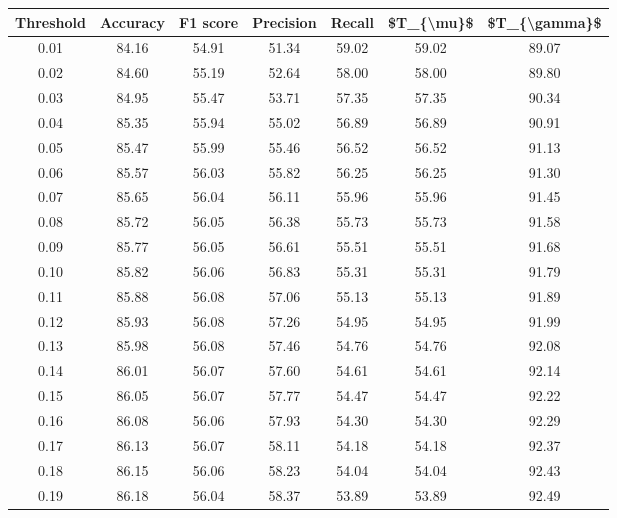\begin{tabular}{|c|c|c|c|c|c|c|}
\hline
 Threshold &  Accuracy &  F1 score &  Precision &  Recall &  \$T\_\{\textbackslash mu\}\$ &  \$T\_\{\textbackslash gamma\}\$ \\
\hline
      0.01 &     84.16 &     54.91 &      51.34 &   59.02 &      59.02 &         89.07 \\
      0.02 &     84.60 &     55.19 &      52.64 &   58.00 &      58.00 &         89.80 \\
      0.03 &     84.95 &     55.47 &      53.71 &   57.35 &      57.35 &         90.34 \\
      0.04 &     85.35 &     55.94 &      55.02 &   56.89 &      56.89 &         90.91 \\
      0.05 &     85.47 &     55.99 &      55.46 &   56.52 &      56.52 &         91.13 \\
      0.06 &     85.57 &     56.03 &      55.82 &   56.25 &      56.25 &         91.30 \\
      0.07 &     85.65 &     56.04 &      56.11 &   55.96 &      55.96 &         91.45 \\
      0.08 &     85.72 &     56.05 &      56.38 &   55.73 &      55.73 &         91.58 \\
      0.09 &     85.77 &     56.05 &      56.61 &   55.51 &      55.51 &         91.68 \\
      0.10 &     85.82 &     56.06 &      56.83 &   55.31 &      55.31 &         91.79 \\
      0.11 &     85.88 &     56.08 &      57.06 &   55.13 &      55.13 &         91.89 \\
      0.12 &     85.93 &     56.08 &      57.26 &   54.95 &      54.95 &         91.99 \\
      0.13 &     85.98 &     56.08 &      57.46 &   54.76 &      54.76 &         92.08 \\
      0.14 &     86.01 &     56.07 &      57.60 &   54.61 &      54.61 &         92.14 \\
      0.15 &     86.05 &     56.07 &      57.77 &   54.47 &      54.47 &         92.22 \\
      0.16 &     86.08 &     56.06 &      57.93 &   54.30 &      54.30 &         92.29 \\
      0.17 &     86.13 &     56.07 &      58.11 &   54.18 &      54.18 &         92.37 \\
      0.18 &     86.15 &     56.06 &      58.23 &   54.04 &      54.04 &         92.43 \\
      0.19 &     86.18 &     56.04 &      58.37 &   53.89 &      53.89 &         92.49 \\

\end{tabular}
